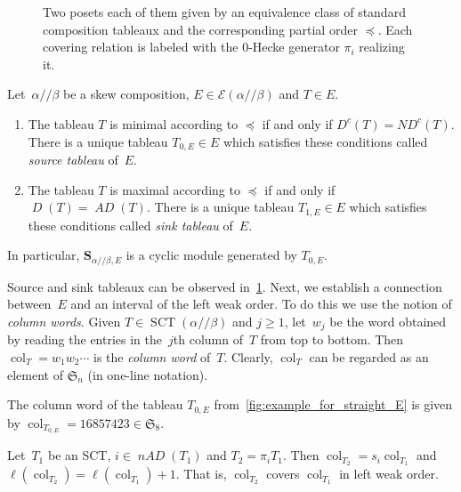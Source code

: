 \documentclass[ALCO,ThmDefs,Unicode,epreuves]{cedram}
\newcommand{\bs}[1]{\boldsymbol{#1} }
\newcommand{\mc}[1]{\mathcal{#1} }
\newcommand{\D}{\operatorname{\mathit{D}}}
\newcommand{\DC}{\operatorname{\mathit{D^c}}}
\newcommand{\AD}{\operatorname{\mathit{AD}}}
\newcommand{\nAD}{\operatorname{\mathit{nAD}}}
\newcommand{\ND}{\operatorname{\mathit{ND^c}}}
\DeclareMathOperator{\SCT}{SCT}
\newcommand{\fS}{\mathfrak{S}}
\newcommand{\fs}{s}
\newcommand{\col}{\operatorname{col}}
\newcommand{\ab}{{\alpha / \! \! / \beta}}
\newcommand{\pleq}{\preceq}
\newcommand{\sse}{\bs S_{\ab,E}}
\begin{document}
\begin{figure}[htb]
{{\begin{tikzpicture}
		\end{tikzpicture} 

	}		\label{fig:example_for_skew_E}
}
		\caption{%
			Two posets each of them given by an equivalence class of standard composition tableaux and the corresponding partial order $\pleq$.
			Each covering relation is labeled with the 0-Hecke generator $\pi_i$ realizing it.
		}
		\label{fig:example_for_E}
\end{figure}
\endgroup


\begin{theo}
	\label{thm:source_and_sink_tableau}
	 Let~$\ab$ be a skew composition, $E\in \mc E(\ab)$ and $T\in E$.
	\begin{enumerate}
		\item The tableau $T$ is minimal according to $\pleq$ if and only if $\DC(T)= \ND(T)$. There is a unique tableau $T_{0,E}\in E$ which satisfies these conditions called \emph{source tableau} of~$E$.
		\item The tableau $T$ is maximal according to $\pleq$ if and only if $\D(T)= \AD(T)$. There is a unique tableau $T_{1,E}\in E$ which satisfies these conditions called \emph{sink tableau} of~$E$.
	\end{enumerate}
	In particular, $\sse$ is a cyclic module generated by $T_{0,E}$.
\end{theo}

Source and sink tableaux can be observed in~\cref{fig:example_for_E}. Next, we establish a connection between~$E$ and an interval of the left weak order. To do this we use the notion of \emph{column words}.
 Given $T\in \SCT(\ab)$ and $j\geq 1$, let~$w_j$ be the word obtained by reading the entries in the~$j$th column of~$T$ from top to bottom. Then $\col_T= w_1 w_2 \cdots$ is the \emph{column word} of~$T$. Clearly, $\col_T$ can be regarded as an element of $\fS_n$ (in one-line notation).
 
\begin{exam}
	The column word of the tableau $T_{0,E}$ from~\cref{fig:example_for_straight_E} is given by $\col_{T_{0,E}} = 16857423\in \fS_8$.
\end{exam}

\begin{lemma}
	\label{thm:tableaux_cover_impies_column_words_cover}
	Let~$T_1$ be an SCT, $i\in \nAD(T_1)$ and $T_2 = \pi_i T_1$. Then $\col_{T_2} = \fs_i \col_{T_1}$ and $\ell(\col_{T_2}) = \ell(\col_{T_1}) + 1$. That is, $\col_{T_2}$ covers $\col_{T_1}$ in left weak order.
\end{lemma}
\end{document}
